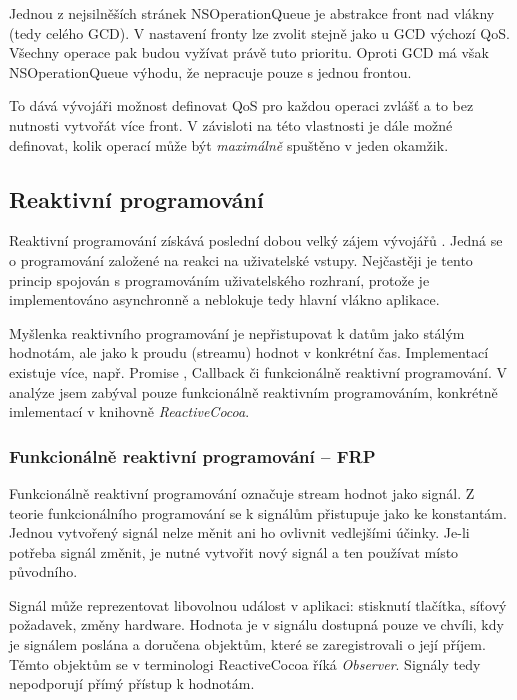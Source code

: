 Jednou z nejsilněších stránek NSOperationQueue je abstrakce front nad vlákny (tedy celého GCD).
V nastavení fronty lze zvolit stejně jako u GCD výchozí QoS.
Všechny operace pak budou vyžívat právě tuto prioritu.
Oproti GCD má však NSOperationQueue výhodu, že nepracuje pouze s jednou frontou.

To dává vývojáři možnost definovat QoS pro každou operaci zvlášť a to bez nutnosti vytvořát více front.
V závisloti na této vlastnosti je dále možné definovat, kolik operací může být \textit{maximálně} spuštěno v jeden okamžik.

\subsection{Reaktivní programování}\label{vlakna-rac}

Reaktivní programování získává poslední dobou velký zájem vývojářů \cite{oneagency-rx}.
Jedná se o programování založené na reakci na uživatelské vstupy.
Nejčastěji je tento princip spojován s programováním uživatelského rozhraní, protože je implementováno asynchronně a neblokuje tedy hlavní vlákno aplikace.

Myšlenka reaktivního programování je nepřistupovat k datům jako stálým hodnotám, ale jako k proudu (streamu) hodnot v konkrétní čas.
Implementací existuje více, např. Promise \cite{slaks-promise}, Callback \cite{yld-callback} či funkcionálně reaktivní programování.
V analýze jsem zabýval pouze funkcionálně reaktivním programováním, konkrétně imlementací v knihovně \textit{ReactiveCocoa}.

\subsubsection*{Funkcionálně reaktivní programování -- FRP}

Funkcionálně reaktivní programování označuje stream hodnot jako signál.
Z teorie funkcionálního programování se k signálům přistupuje jako ke konstantám.
Jednou vytvořený signál nelze měnit ani ho ovlivnit vedlejšími účinky.
Je-li potřeba signál změnit, je nutné vytvořit nový signál a ten používat místo původního.

Signál může reprezentovat libovolnou událost v aplikaci: stisknutí tlačítka, síťový požadavek, změny hardware.
Hodnota je v signálu dostupná pouze ve chvíli, kdy je signálem poslána a doručena objektům, které se zaregistrovali o její příjem.
Těmto objektům se v terminologi ReactiveCocoa říká \textit{Observer}.
Signály tedy nepodporují přímý přístup k hodnotám.


